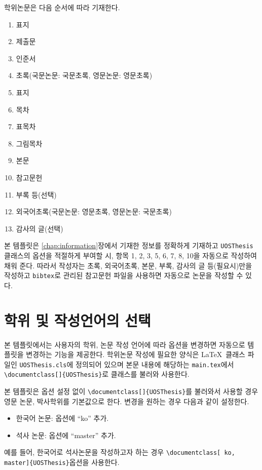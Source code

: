 \documentclass[ko]{UOSThesis}
\begin{document}
학위논문은 다음 순서에 따라 기재한다. 
\begin{enumerate}
\small
\singlespacing
    \item 표지
    \item 제출문
    \item 인준서
    \item 초록(국문논문: 국문초록, 영문논문: 영문초록)
    \item 표지
    \item 목차
    \item 표목차
    \item 그림목차
    \item 본문
    \item 참고문헌
    \item 부록 등(선택)
    \item 외국어초록(국문논문: 영문초록, 영문논문: 국문초록)
    \item 감사의 글(선택)
\end{enumerate}

본 템플릿은 \ref{chap:information}장에서 기재한 정보를 정확하게 기재하고 \texttt{UOSThesis} 클래스의 옵션을 적절하게 부여할 시, 항목 1, 2, 3, 5, 6, 7, 8, 10을 자동으로 작성하여 채워 준다. 따라서 작성자는 초록, 외국어초록, 본문, 부록, 감사의 글 등(필요시)만을 작성하고 \texttt{bibtex}로 관리된 참고문헌 파일을 사용하면 자동으로 논문을 작성할 수 있다.

\chapter{학위 및 작성언어의 선택}
\label{chap:setdeglang}

본 템플릿에서는 사용자의 학위, 논문 작성 언어에 따라 옵션을 변경하면 자동으로 템플릿을 변경하는 기능을 제공한다. 학위논문 작성에 필요한 양식은 \LaTeX~클래스 파일인 \texttt{UOSThesis.cls}에 정의되어 있으며 본문 내용에 해당하는 \texttt{main.tex}에서 \texttt{\textbackslash documentclass[]\{UOSThesis\}}로 클래스를 불러와 사용한다.

본 템플릿은 옵션 설정 없이 \texttt{\textbackslash documentclass[]\{UOSThesis\}}를 불러와서 사용할 경우 영문 논문, 박사학위를 기본값으로 한다. 변경을 원하는 경우 다음과 같이 설정한다.
\begin{itemize}
\small
\singlespacing
    \item 한국어 논문: 옵션에 ``ko'' 추가.
    \item 석사 논문: 옵션에 ``master'' 추가.
\end{itemize}

예를 들어, 한국어로 석사논문을 작성하고자 하는 경우 \texttt{\textbackslash documentclass[  ko, master]\{UOSThesis\}}옵션을 사용한다.
\end{document}

